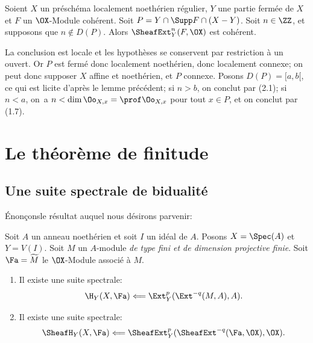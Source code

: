 \begin{proposition}\label{VII.2.3} Soient $X$ un pr\'esch\'ema localement noeth\'erien r\'egulier, $Y$ une partie ferm\'ee de $X$ et $F$ un $\OX$-Module coh\'erent. Soit $P = Y \cap \Supp F \cap (X - Y)$. Soit $n \in \ZZ$, et supposons que $n \not\in D(P)$. Alors $\SheafExt^n_Y (F, \OX)$ est coh\'erent.
\end{proposition}

La conclusion est locale et les hypoth\`eses se conservent par restriction \`a un ouvert. Or $P$ est ferm\'e donc localement noeth\'erien, donc localement connexe; on peut donc supposer $X$ affine et noeth\'erien, et $P$ connexe. Posons $D(P) = [a, b[$, ce qui est licite d'apr\`es le lemme pr\'ec\'edent; si $n> b$, on conclut par (2.1); si $n < a$, on~a \hbox{$n < \dim \Oo_{X, x} = \prof \Oo_{X, x}$} pour tout $x \in P$, et on conclut par (1.7).

\chapter{Le th\'eor\`eme de finitude} \label{VIII}

\section[Une suite spectrale de bidualit\'e]
{Une suite spectrale de bidualit\'e\protect\sfootnotemark}\label{VIII.1}

\renewcommand{\theequation}{\thesection.\arabic{equation}}

\'Enon\c cons\pageoriginale le r\'esultat auquel nous d\'esirons parvenir:

\begin{proposition} \label{VIII.1.1} Soit $A$ un anneau noeth\'erien et soit $I$ un id\'eal de $A$. Posons $X=\Spec(A)$ et $Y=V(I)$. Soit $M$ un $A$-module \emph{de type fini et de dimension projective finie}. Soit ${\Fa}=\widetilde{M}$ le $\OX$-Module associ\'e \`a $M$.
\begin{enumerate}
\item[\textup{1)}] Il existe une suite spectrale:
\[
\H_Y(X, {\Fa}) \Longleftarrow \Ext^p_Y(\Ext^{-q}(M, A), A).
\]

\item[\textup{2)}] Il existe une suite spectrale:
\[
\SheafH_Y(X, {\Fa}) \Longleftarrow \SheafExt^p_Y(\SheafExt^{-q}({\Fa}, \OX), \OX).
\]
\end{enumerate}
\end{proposition}

